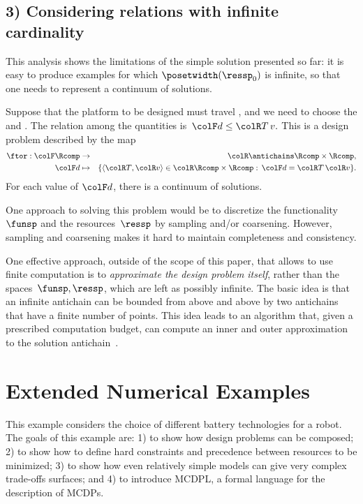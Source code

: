 \subsection{3) Considering relations with infinite cardinality}

This analysis shows the limitations of the simple solution presented
so far: it is easy to produce examples for which $\posetwidth(\ressp_{0})$
is infinite, so that one needs to represent a continuum of solutions.

\begin{example}
Suppose that the platform to be designed must travel , and we need to choose the 
and . The relation among the quantities
is~${\colF d}\leq{\colR T\,v}.$ This is a design problem described
by the map
\begin{eqnarray*}
\ftor:{\colF\Rcomp} & \rightarrow & {\colR\antichains\Rcomp\times\Rcomp,}\\
{\colF d} & \mapsto & \{\langle{\colR T},{\colR v}\rangle\in{\colR\Rcomp\times\Rcomp}:\,{\colF d}={\colR T}\,{\colR v}\}.
\end{eqnarray*}
For each value of ${\colF d}$, there is a continuum of solutions.
\end{example}
One approach to solving this problem would be to discretize the functionality~$\funsp$
and the resources~$\ressp$ by sampling and/or coarsening. However,
sampling and coarsening makes it hard to maintain completeness and
consistency.

One effective approach, outside of the scope of this paper, that allows
to use finite computation is to \emph{approximate the design problem}
\emph{itself}, rather than the spaces~$\funsp,\ressp$, which are
left as possibly infinite. The basic idea is that an infinite antichain
can be bounded from above and above by two antichains that have a
finite number of points. This idea leads to an algorithm that, given
a prescribed computation budget, can compute an inner and outer approximation
to the solution antichain~\cite{mcdp_icra_uncertainty_arxiv}.



\section{Extended Numerical Examples\label{sec:Numerical-examples}}

This example considers the choice of different battery technologies
for a robot. The goals of this example are: 1) to show how design
problems can be composed; 2) to show how to define hard constraints
and precedence between resources to be minimized; 3) to show how even
relatively simple models can give very complex trade-offs surfaces;
and 4) to introduce MCDPL, a formal language for the description of
MCDPs.

